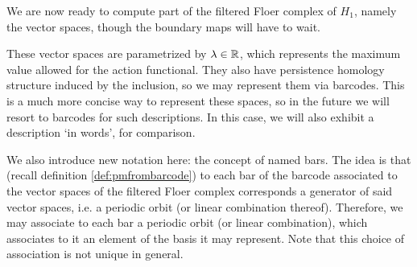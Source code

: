 We are now ready to compute part of the filtered Floer complex of $H_1$, namely the vector spaces, though the boundary maps will have to wait.

These vector spaces are parametrized by $\lambda \in \mathbb{R}$, which represents the maximum value allowed for the action functional. They also have persistence homology structure induced by the inclusion, so we may represent them via barcodes. This is a much more concise way to represent these spaces, so in the future we will resort to barcodes for such descriptions. In this case, we will also exhibit a description `in words', for comparison.

We also introduce new notation here: the concept of named bars. The idea is that (recall definition \ref{def:pmfrombarcode}) to each bar of the barcode associated to the vector spaces of the filtered Floer complex corresponds a generator of said vector spaces, i.e. a periodic orbit (or linear combination thereof). Therefore, we may associate to each bar a periodic orbit (or linear combination), which associates to it an element of the basis it may represent. Note that this choice of association is not unique in general.


